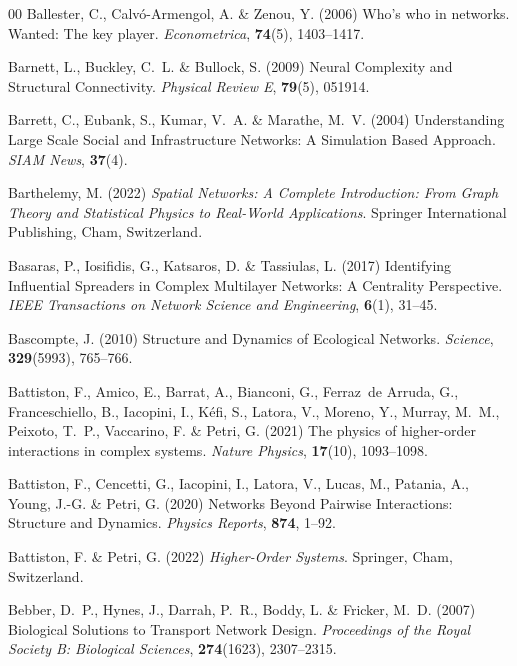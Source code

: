 \documentclass{comnet-mod}
\begin{document}
\begin{thebibliography}{00}
Ballester, C., Calv{\'o}-Armengol, A. {\&} Zenou, Y. (2006)  {Who's who in
  networks. Wanted: The key player}. {\em Econometrica}, \textbf{74}(5),
  1403--1417.

Barnett, L., Buckley, C.~L. {\&} Bullock, S. (2009)  {Neural Complexity and
  Structural Connectivity}. {\em {Physical Review E}}, \textbf{79}(5), 051914.

Barrett, C., Eubank, S., Kumar, V.~A. {\&} Marathe, M.~V. (2004)
  {Understanding Large Scale Social and Infrastructure Networks: A Simulation
  Based Approach}. {\em {SIAM News}}, \textbf{37}(4).

Barthelemy, M. (2022) {\em Spatial Networks: A Complete Introduction: From
  Graph Theory and Statistical Physics to Real-World Applications}.
Springer International Publishing, Cham, Switzerland.

Basaras, P., Iosifidis, G., Katsaros, D. {\&} Tassiulas, L. (2017)
  {Identifying Influential Spreaders in Complex Multilayer Networks: {{A}}
  Centrality Perspective}. {\em {IEEE Transactions on Network Science and
  Engineering}}, \textbf{6}(1), 31--45.

Bascompte, J. (2010)  {Structure and Dynamics of Ecological Networks}. {\em
  {Science}}, \textbf{329}(5993), 765--766.

Battiston, F., Amico, E., Barrat, A., Bianconi, G., Ferraz~de Arruda, G.,
  Franceschiello, B., Iacopini, I., K{\'e}fi, S., Latora, V., Moreno, Y.,
  Murray, M.~M., Peixoto, T.~P., Vaccarino, F. {\&} Petri, G. (2021)  The
  physics of higher-order interactions in complex systems. {\em {Nature
  Physics}}, \textbf{17}(10), 1093--1098.

Battiston, F., Cencetti, G., Iacopini, I., Latora, V., Lucas, M., Patania, A.,
  Young, J.-G. {\&} Petri, G. (2020)  {Networks Beyond Pairwise Interactions:
  {{Structure}} and Dynamics}. {\em {Physics Reports}}, \textbf{874}, 1--92.

Battiston, F. {\&} Petri, G. (2022) {\em {Higher-Order Systems}}.
Springer, {Cham, Switzerland}.

Bebber, D.~P., Hynes, J., Darrah, P.~R., Boddy, L. {\&} Fricker, M.~D. (2007)
  {Biological Solutions to Transport Network Design}. {\em {Proceedings of the
  Royal Society B: Biological Sciences}}, \textbf{274}(1623), 2307--2315.


\end{thebibliography}
\end{document}
